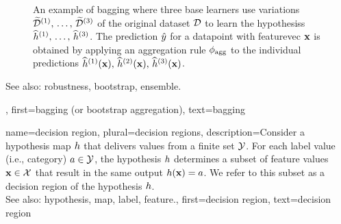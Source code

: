 {{\begin{figure}[htbp]
\begin{center}
		\caption{An example of bagging where three base learners use variations 
		$\widetilde{\mathcal{D}}^{(1)},\,\ldots,\,\widetilde{\mathcal{D}}^{(3)}$ of 
		the original \gls{dataset} $\mathcal{D}$ to learn the \glspl{hypothesis} 
		$\widehat{h}^{(1)},\,\ldots,\,\widehat{h}^{(3)}$. 
		The \gls{prediction} $\hat{y}$ for a \gls{datapoint} with \gls{featurevec} ${\bf x}$ 
		is obtained by applying an aggregation rule $\phi_{\rm agg}$ to the individual \glspl{prediction} 
		$\widehat{h}^{(1)}({\bf x}),\,\widehat{h}^{(2)}({\bf x}),\,\widehat{h}^{(3)}({\bf x})$.}
		\end{center}
		\end{figure}
		See also: \gls{robustness}, \gls{bootstrap}, \gls{ensemble}.},
	first={bagging (or bootstrap aggregation)},
	text={bagging}
}

{name={decision region}, plural={decision regions}, 
	description={Consider 
		a \gls{hypothesis} \gls{map} $h$ that delivers values from a finite set $\mathcal{Y}$. 
		For each \gls{label} value (i.e., category) $a \in \mathcal{Y}$, the \gls{hypothesis} $h$ 
		determines a subset of \gls{feature} values ${\bf x} \in \mathcal{X}$ that result 
		in the same output $h({\bf x})=a$. We refer to this subset as a decision 
		region of the \gls{hypothesis} $h$.
				\\
		See also: \gls{hypothesis}, \gls{map}, \gls{label}, \gls{feature}.},
	first={decision region},
	text={decision region} 
}



